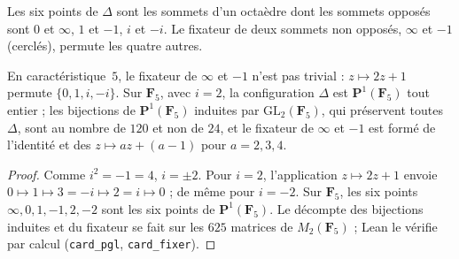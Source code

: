 Les six points de $\Delta$ sont les sommets d'un octaèdre dont les sommets opposés sont $0$ et $\infty$, $1$ et $-1$, $i$ et $-i$. Le fixateur de deux sommets non opposés, $\infty$ et $-1$ (cerclés), permute les quatre autres.
\begin{center}
\end{center}

\begin{encadre}
\begin{contrexemple}\label{ce:64-car5}
En caractéristique~$5$, le fixateur de $\infty$ et $-1$ n'est pas trivial : $z \mapsto 2z + 1$ permute $\{0, 1, i, -i\}$. Sur $\mathbf F_5$, avec $i = 2$, la configuration $\Delta$ est $\mathbf P^1(\mathbf F_5)$ tout entier ; les bijections de $\mathbf P^1(\mathbf F_5)$ induites par $\mathrm{GL}_2(\mathbf F_5)$, qui préservent toutes $\Delta$, sont au nombre de $120$ et non de $24$, et le fixateur de $\infty$ et $-1$ est formé de l'identité et des $z \mapsto az + (a - 1)$ pour $a = 2, 3, 4$.
\end{contrexemple}
\end{encadre}

\begin{proof}
Comme $i^2 = -1 = 4$, $i = \pm 2$. Pour $i = 2$, l'application $z \mapsto 2z + 1$ envoie $0 \mapsto 1 \mapsto 3 = -i \mapsto 2 = i \mapsto 0$ ; de même pour $i = -2$. Sur $\mathbf F_5$, les six points $\infty, 0, 1, -1, 2, -2$ sont les six points de $\mathbf P^1(\mathbf F_5)$. Le décompte des bijections induites et du fixateur se fait sur les $625$ matrices de $M_2(\mathbf F_5)$ ; Lean le vérifie par calcul (\texttt{card\_pgl}, \texttt{card\_fixer}).
\end{proof}

